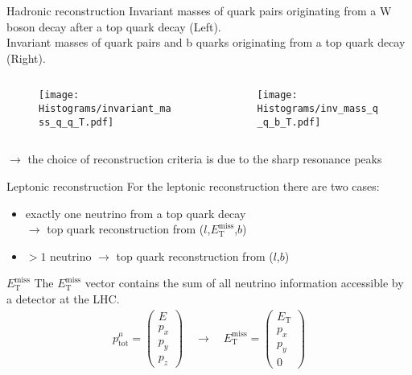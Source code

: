 \documentclass[aspectratio=1610, professionalfonts, 9pt]{beamer}
\begin{document}
\begin{frame}{Hadronic reconstruction}
    Invariant masses of quark pairs originating from a W boson decay after a top quark decay (Left). \\
    Invariant masses of quark pairs and b quarks originating from a top quark decay (Right).
    \begin{columns}
        \begin{column}{0.5\textwidth}
            \begin{figure}
                \centering
                \texttt{[image: Histograms/invariant\_mass\_q\_q\_T.pdf]}
                \label{fig:hadro_reco1}
            \end{figure}
        \end{column}
        \begin{column}{0.5\textwidth}
            \begin{figure}
                \centering
                \texttt{[image: Histograms/inv\_mass\_q\_q\_b\_T.pdf]}
                \label{fig:hadro_reco2}
            \end{figure}
        \end{column}
    \end{columns}
    \(\rightarrow\) the choice of reconstruction criteria is due to the sharp resonance peaks
\end{frame}

\begin{frame}{Leptonic reconstruction}
  For the leptonic reconstruction there are two cases:
  \begin{itemize}
    \item exactly one neutrino from a top quark decay \\
    \(\rightarrow\) top quark reconstruction from (\(l\),\(E_{\mathrm{T}}^\mathrm{{miss}}\),\(b\))
    \item \(> 1\) neutrino \(\rightarrow\) top quark reconstruction from (\(l\),\(b\))
  \end{itemize}
  \vspace{3mm}
  \begin{block}{\(E_{\mathrm{T}}^\mathrm{{miss}}\)}
    The \(E_{\mathrm{T}}^\mathrm{{miss}}\) vector contains the sum of all neutrino information accessible by a detector at the LHC.
    \begin{align*}
      p^{\mu}_{\mathrm{tot}}= \begin{pmatrix}E\\p_x\\p_y\\p_z\end{pmatrix} \quad \rightarrow \quad E_{\mathrm{T}}^\mathrm{{miss}} = \begin{pmatrix}E_{\mathrm{T}}\\p_x\\p_y\\0\end{pmatrix}
    \end{align*}
  \end{block}
\end{frame}
\end{document}
